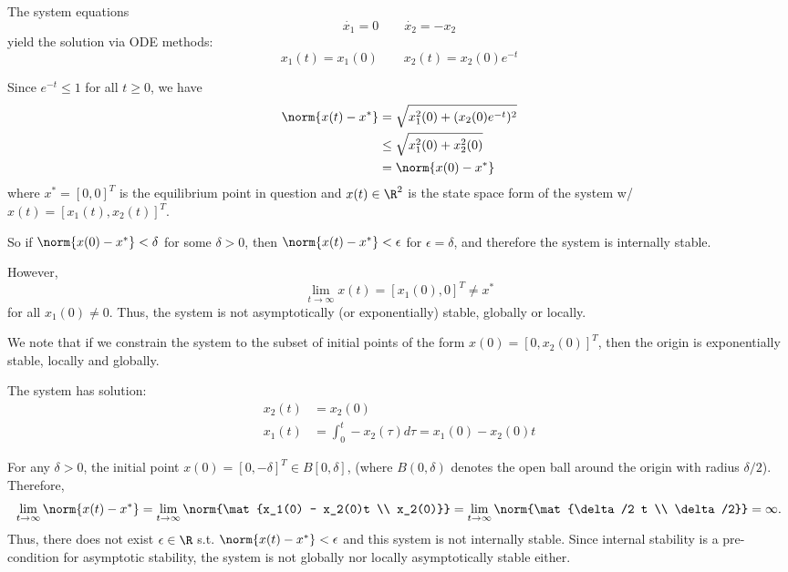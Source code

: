 \documentclass{homework}
\begin{document}
\begin{letterenum}
    \item The system equations
    \begin{equation}
        \dot{x_1} = 0 \qquad \dot{x_2} = -x_2
    \end{equation}
    yield the solution via ODE methods:
    \begin{equation}
        x_1(t) = x_1(0) \qquad x_2(t) = x_2(0)e^{-t}
    \end{equation}

    Since $e^{-t} \leq 1$ for all $t \geq 0$, we have
    \begin{align*}
        \norm{x(t) - x^*} &= \sqrt{x_1^2(0) + (x_2(0)e^{-t})^2} \\
            &\leq \sqrt{x_1^2(0) + x_2^2(0)} \\
            &= \norm{x(0) - x^*}
    \end{align*}
    where $x^* = [0, 0]^T$ is the equilibrium point in question and 
    $x(t) \in \R^2$ is the state space form of the system w/
    $x(t) = [x_1(t), x_2(t)]^T$.

    So if $\norm{x(0) - x^*} < \delta$ for some $\delta > 0$, then
    $\norm{x(t) - x^*} < \epsilon$ for $\epsilon = \delta$,
    and therefore the system is internally stable.

    However,
    \begin{equation}
        \lim_{t\to\infty} x(t) = [x_1(0), 0]^T \neq x^*
    \end{equation}
    for all $x_1(0)\neq 0$. Thus, the system is not asymptotically
    (or exponentially) stable, globally or locally.

    We note that if we constrain the system to the subset of initial points
    of the form $x(0) = [0, x_2(0)]^T$, then the origin is exponentially stable,
    locally and globally.

    \item The system has solution:
    \begin{align*}
        x_2(t) &= x_2(0) \\
        x_1(t) &= \int_{0}^{t} -x_2(\tau)d\tau = x_1(0) - x_2(0) t
    \end{align*}

    For any $\delta > 0$, the initial point $x(0) = [0, -\delta]^T \in B[0, \delta]$,
    (where $B(0, \delta)$ denotes the open ball around the origin with radius
    $\delta/2$). Therefore,
    \begin{equation}
        \lim_{t\to\infty} \norm{x(t) - x^*}
            = \lim_{t\to\infty} \norm{\mat{x_1(0) - x_2(0)t \\ x_2(0)}}
            = \lim_{t\to\infty} \norm{\mat{\delta/2 t \\ \delta/2}} = \infty.
    \end{equation}
    Thus, there does not exist $\epsilon \in \R$ s.t.
    $\norm{x(t) - x^*} < \epsilon$ and this system is not internally stable.
    Since internal stability is a pre-condition for asymptotic stability,
    the system is not globally nor locally asymptotically stable either.


\end{letterenum}
\end{document}
